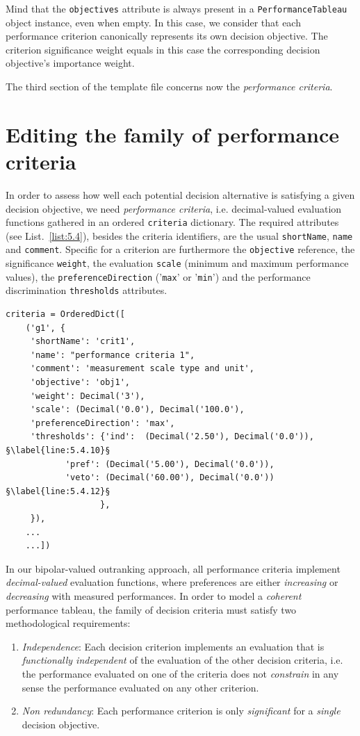 Mind that the \texttt{objectives} attribute is always present in a \texttt{PerformanceTab\-leau} object instance, even when empty. In this case, we consider that each performance criterion canonically represents its own decision objective. The criterion significance weight equals in this case the corresponding decision objective's importance weight.

The third section of the template file concerns now the \emph{performance criteria}.

\section{Editing the family of performance criteria}
\label{sec:5.4}

In order to assess how well each potential decision alternative is satisfying a given decision objective, we need \emph{performance criteria}, i.e. decimal-valued evaluation functions gathered in an ordered \texttt{criteria} dictionary. The required attributes (see List.~\vref{list:5.4}), besides the criteria identifiers, are the usual \texttt{shortName}, \texttt{name} and \texttt{comment}. Specific for a criterion are furthermore the \texttt{objective} reference, the significance \texttt{weight}, the evaluation \texttt{scale} (minimum and  maximum performance values), the \texttt{preferenceDirection} ('\texttt{max}' or '\texttt{min}') and the performance discrimination \texttt{thresholds} attributes.
\begin{lstlisting}[caption={Example of performance criteria description},label=list:5.4]
   criteria = OrderedDict([
    ('g1', {
     'shortName': 'crit1',
     'name': "performance criteria 1",
     'comment': 'measurement scale type and unit',
     'objective': 'obj1',
     'weight': Decimal('3'),
     'scale': (Decimal('0.0'), Decimal('100.0'),
     'preferenceDirection': 'max',
     'thresholds': {'ind':  (Decimal('2.50'), Decimal('0.0')), §\label{line:5.4.10}§
		    'pref': (Decimal('5.00'), Decimal('0.0')),
		    'veto': (Decimal('60.00'), Decimal('0.0')) §\label{line:5.4.12}§
                   },
     }),
    ...
    ...])
\end{lstlisting}

In our bipolar-valued outranking approach, all performance criteria implement \emph{decimal-valued} evaluation functions, where preferences are either \emph{increasing} or \emph{decreasing} with measured performances. In order to model a \emph{coherent} performance tableau, the family of decision criteria must satisfy two methodological requirements:
\begin{enumerate}[leftmargin=1cm,topsep=1pt]
  \item \emph{Independence}: Each decision criterion implements an evaluation that is \emph{functionally independent} of the evaluation of the other decision criteria, i.e. the performance evaluated on one of the criteria does not \emph{constrain} in any sense the performance evaluated on any other criterion.
  \item \emph{Non redundancy}: Each performance criterion is only \emph{significant} for a \emph{single} decision objective.
\end{enumerate}

